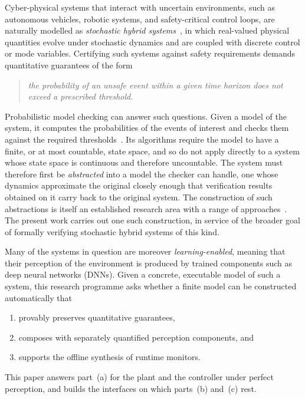 \documentclass[11pt,a4paper]{article}
\theoremstyle{plain}
\theoremstyle{remark}
\begin{document}
	Cyber-physical systems that interact with uncertain environments, such as autonomous vehicles, robotic systems, and safety-critical control loops, are naturally modelled as \emph{stochastic hybrid systems}~\cite{LSAZ22}, in which real-valued physical quantities evolve under stochastic dynamics and are coupled with discrete control or mode variables. Certifying such systems against safety requirements demands quantitative guarantees of the form
	\begin{quote}
		\emph{the probability of an unsafe event within a given time horizon does not exceed a prescribed threshold.}
	\end{quote}
	Probabilistic model checking can answer such questions. Given a model of the system, it computes the probabilities of the events of interest and checks them against the required thresholds~\cite{KNP25}. Its algorithms require the model to have a finite, or at most countable, state space, and so do not apply directly to a system whose state space is continuous and therefore uncountable. The system must therefore first be \emph{abstracted} into a model the checker can handle, one whose dynamics approximate the original closely enough that verification results obtained on it carry back to the original system. The construction of such abstractions is itself an established research area with a range of approaches~\cite{LSAZ22}. The present work carries out one such construction, in service of the broader goal of formally verifying stochastic hybrid systems of this kind.
	
	Many of the systems in question are moreover \emph{learning-enabled}, meaning that their perception of the environment is produced by trained components such as deep neural networks (DNNs). Given a concrete, executable model of such a system, this research programme asks whether a finite model can be constructed automatically that
	\begin{enumerate}
		\item[(a)] provably preserves quantitative guarantees,
		\item[(b)] composes with separately quantified perception components, and
		\item[(c)] supports the offline synthesis of runtime monitors.
	\end{enumerate}
	This paper answers part~(a) for the plant and the controller under perfect perception, and builds the interfaces on which parts~(b) and~(c) rest.
	
\end{document}

